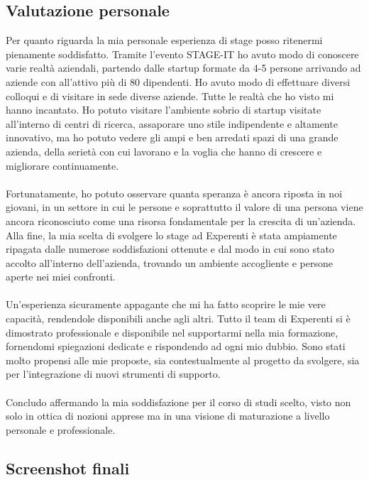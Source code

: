 \subsection{Valutazione personale}
Per quanto riguarda la mia personale esperienza di stage posso ritenermi pienamente soddisfatto. Tramite l'evento STAGE-IT ho avuto modo di conoscere varie realt\`a aziendali, partendo dalle startup formate da 4-5 persone arrivando ad aziende con all'attivo pi\`u di 80 dipendenti. Ho avuto modo di effettuare diversi colloqui e di visitare in sede diverse aziende. Tutte le realt\`a che ho visto mi hanno incantato. Ho potuto visitare l'ambiente sobrio di startup visitate all'interno di centri di ricerca, assaporare uno stile indipendente e altamente innovativo, ma ho potuto vedere gli ampi e ben arredati spazi di una grande azienda, della seriet\`a con cui lavorano e la voglia che hanno di crescere e migliorare continuamente.\\\\
Fortunatamente, ho potuto osservare quanta speranza \`e ancora riposta in noi giovani, in un settore in cui le persone e soprattutto il valore di una persona viene ancora riconosciuto come una risorsa fondamentale per la crescita di un'azienda.\\
Alla fine, la mia scelta di svolgere lo stage ad Experenti \`e stata ampiamente ripagata dalle numerose soddisfazioni ottenute e dal modo in cui sono stato accolto all'interno dell'azienda, trovando un ambiente accogliente e persone aperte nei miei confronti.\\\\
Un'esperienza sicuramente appagante che mi ha fatto scoprire le mie vere capacit\`a, rendendole disponibili anche agli altri.
Tutto il team di Experenti si \`e dimostrato professionale e disponibile nel supportarmi nella mia formazione, fornendomi spiegazioni dedicate e rispondendo ad ogni mio dubbio. Sono stati molto propensi alle mie proposte, sia contestualmente al progetto da svolgere, sia per l'integrazione di nuovi strumenti di supporto.\\\\
Concludo affermando la mia soddisfazione per il corso di studi scelto, visto non solo in ottica di nozioni apprese ma in una visione di maturazione a livello personale e professionale.
\newpage
\subsection{Screenshot finali}

